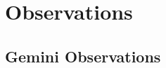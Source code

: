 \documentclass[12pt,preprint]{emulateapj}
\begin{document}
\section{Observations}






\subsection{Gemini Observations}
\end{document}
